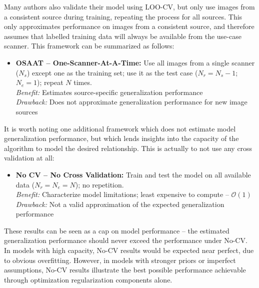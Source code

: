 Many authors also validate their model using LOO-CV,
but only use images from a consistent source during training,
repeating the process for all sources.
This only approximates performance on images from a consistent source,
and therefore assumes that labelled training data
will always be available from the use-case scanner.
This framework can be summarized as follows:
\begin{itemize}
  \item\textbf{OSAAT -- One-Scanner-At-A-Time:}
  Use all images from a single scanner ($N_s$) except one as the training set;
  use it as the test case ($N_r = N_s-1$; $N_e = 1$);
  repeat $N$ times.
  \\\textit{Benefit:} Estimates source-specific generalization performance
  \\\textit{Drawback:} Does not approximate generalization performance for new image sources
\end{itemize}
\par
It is worth noting one additional framework which
does not estimate model generalization performance,
but which lends insights into the capacity of the algorithm
to model the desired relationship.
This is actually to not use any cross validation at all:
\begin{itemize}
  \item\textbf{No CV -- No Cross Validation:}
  Train and test the model on all available data ($N_r = N_e = N$);
  no repetition.
  \\\textit{Benefit:} Characterize model limitations; least expensive to compute -- $\mathcal{O}(1)$
  \\\textit{Drawback:} Not a valid approximation of the expected generalization performance
\end{itemize}
These results can be seen as a cap on model performance
-- the estimated generalization performance should never exceed the performance under No-CV.
In models with high capacity, No-CV results would be expected near perfect,
due to obvious overfitting.
However, in models with stronger priors or imperfect assumptions,
No-CV results illustrate the best possible performance achievable
through optimization regularization components alone.

